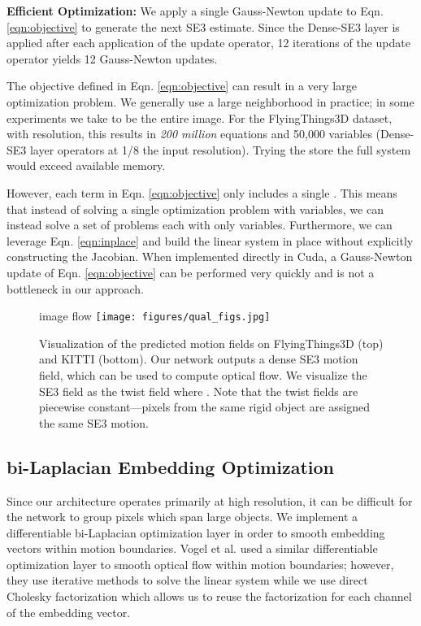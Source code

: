 \documentclass[final]{cvpr}
\begin{document}
\vspace{1mm} \noindent \textbf{Efficient Optimization:} We apply a single Gauss-Newton update to Eqn. \ref{eqn:objective} to generate the next SE3 estimate. Since the Dense-SE3 layer is applied after each application of the update operator, 12 iterations of the update operator yields 12 Gauss-Newton updates.

The objective defined in Eqn. \ref{eqn:objective} can result in a very large optimization problem. We generally use a large neighborhood  in practice; in some experiments we take  to be the entire image. For the FlyingThings3D dataset, with  resolution, this results in \emph{200 million} equations and 50,000 variables (Dense-SE3 layer operators at 1/8 the input resolution). Trying the store the full system would exceed available memory. 

However, each term in Eqn. \ref{eqn:objective} only includes a single . This means that instead of solving a single optimization problem with  variables, we can instead solve a set of  problems each with only  variables. Furthermore, we can leverage Eqn. \ref{eqn:inplace} and build the linear system in place without explicitly constructing the Jacobian. When implemented directly in Cuda, a Gauss-Newton update of Eqn. \ref{eqn:objective} can be performed very quickly and is not a bottleneck in our approach.

\begin{figure*}
    \small \hspace{-8mm} image \hspace{28mm} flow \hspace{30mm}  \hspace{30mm} 
    \centering
    \texttt{[image: figures/qual\_figs.jpg]}
    \caption{Visualization of the predicted motion fields on FlyingThings3D (top) and KITTI (bottom). Our network outputs a dense SE3 motion field,  which can be used to compute optical flow. We visualize the SE3 field as the twist field where . Note that the twist fields are piecewise constant---pixels from the same rigid object are assigned the same SE3 motion.}
    \label{fig:examples}
\end{figure*}



\subsection{bi-Laplacian Embedding Optimization}
Since our architecture operates primarily at high resolution, it can be difficult for the network to group pixels which span large objects. We implement a differentiable bi-Laplacian optimization layer in order to smooth embedding vectors within motion boundaries. Vogel et al. \cite{vogel2018learning} used a similar differentiable optimization layer to smooth optical flow within motion boundaries; however, they use iterative methods to solve the linear system while we use direct Cholesky factorization which allows us to reuse the factorization for each channel of the embedding vector.
\end{document}
